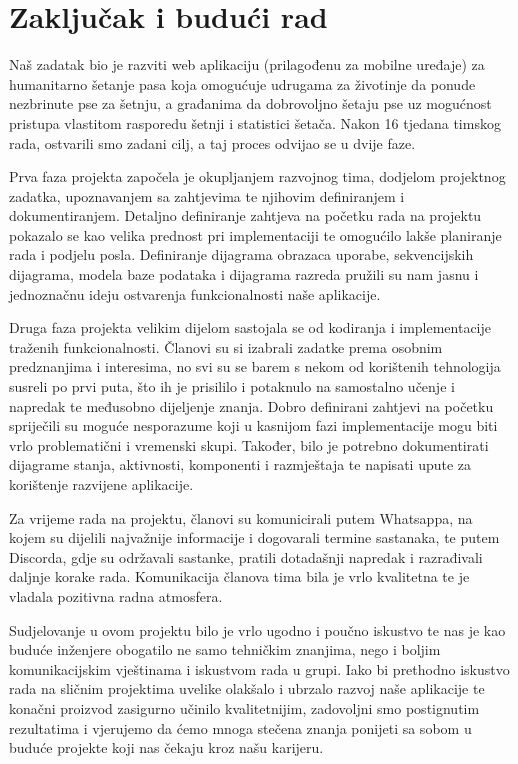 \chapter{Zaključak i budući rad}
		
		 Naš zadatak bio je razviti web aplikaciju (prilagođenu za mobilne uređaje) za humanitarno šetanje pasa koja omogućuje udrugama za životinje da ponude nezbrinute pse za šetnju, a građanima da dobrovoljno šetaju pse uz mogućnost pristupa vlastitom rasporedu šetnji i statistici šetača. Nakon 16 tjedana timskog rada, ostvarili smo zadani cilj, a taj proces odvijao se u dvije faze.
		
		 Prva faza projekta započela je okupljanjem razvojnog tima, dodjelom projektnog zadatka, upoznavanjem sa zahtjevima te njihovim definiranjem i dokumentiranjem. Detaljno definiranje zahtjeva na početku rada na projektu pokazalo se kao velika prednost pri implementaciji te omogućilo lakše planiranje rada i podjelu posla. Definiranje dijagrama obrazaca uporabe, sekvencijskih dijagrama, modela baze podataka i dijagrama razreda pružili su nam jasnu i jednoznačnu ideju ostvarenja funkcionalnosti naše aplikacije.
		 
		 Druga faza projekta velikim dijelom sastojala se od kodiranja i implementacije traženih funkcionalnosti. Članovi su si izabrali zadatke prema osobnim predznanjima i interesima, no svi su se barem s nekom od korištenih tehnologija susreli po prvi puta, što ih je prisililo i potaknulo na samostalno učenje i napredak te međusobno dijeljenje znanja. Dobro definirani zahtjevi na početku spriječili su moguće nesporazume koji u kasnijom fazi implementacije mogu biti vrlo problematični i vremenski skupi. Također, bilo je potrebno dokumentirati dijagrame stanja, aktivnosti, komponenti i razmještaja te napisati upute za korištenje razvijene aplikacije.
		 
		 Za vrijeme rada na projektu, članovi su komunicirali putem Whatsappa, na kojem su dijelili najvažnije informacije i dogovarali termine sastanaka, te putem Discorda, gdje su održavali sastanke, pratili dotadašnji napredak i razrađivali daljnje korake rada. Komunikacija članova tima bila je vrlo kvalitetna te je vladala pozitivna radna atmosfera.
		 
		 Sudjelovanje u ovom projektu bilo je vrlo ugodno i poučno iskustvo te nas je kao buduće inženjere obogatilo ne samo tehničkim znanjima, nego i boljim komunikacijskim vještinama i iskustvom rada u grupi. Iako bi prethodno iskustvo rada na sličnim projektima uvelike olakšalo i ubrzalo razvoj naše aplikacije te konačni proizvod zasigurno učinilo kvalitetnijim, zadovoljni smo postignutim rezultatima i vjerujemo da ćemo mnoga stečena znanja ponijeti sa sobom u buduće projekte koji nas čekaju kroz našu karijeru.